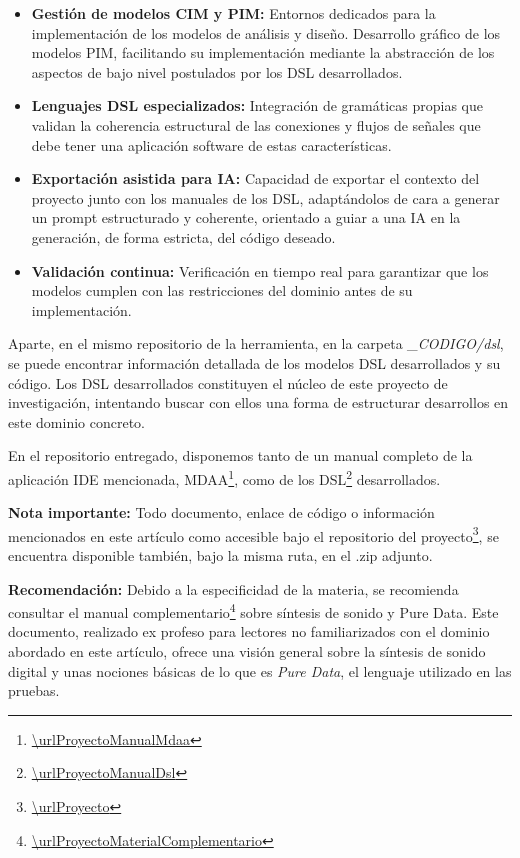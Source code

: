 \begin{itemize}
    \item \textbf{Gestión de modelos CIM y PIM:} Entornos dedicados para la implementación de los modelos de análisis y diseño. Desarrollo gráfico de los modelos PIM, facilitando su implementación mediante la abstracción de los aspectos de bajo nivel postulados por los DSL desarrollados.
    \item \textbf{Lenguajes DSL especializados:} Integración de gramáticas propias que validan la coherencia estructural de las conexiones y flujos de señales que debe tener una aplicación software de estas características.
    \item \textbf{Exportación asistida para IA:} Capacidad de exportar el contexto del proyecto junto con los manuales de los DSL, adaptándolos de cara a generar un prompt estructurado y coherente, orientado a guiar a una IA en la generación, de forma estricta, del código deseado.
    \item \textbf{Validación continua:} Verificación en tiempo real para garantizar que los modelos cumplen con las restricciones del dominio antes de su implementación.
\end{itemize}

Aparte, en el mismo repositorio de la herramienta, en la carpeta \textit{\_CODIGO/dsl}, se puede encontrar información detallada de los modelos DSL desarrollados y su código. Los DSL desarrollados constituyen el núcleo de este proyecto de investigación, intentando buscar con ellos una forma de estructurar desarrollos en este dominio concreto.

En el repositorio entregado, disponemos tanto de un manual completo de la aplicación IDE mencionada, MDAA\footnote{\url{\urlProyectoManualMdaa}}, como de los DSL\footnote{\url{\urlProyectoManualDsl}} desarrollados.

\textbf{Nota importante:} Todo documento, enlace de código o información mencionados en este artículo como accesible bajo el repositorio del proyecto\footnote{\url{\urlProyecto}}, se encuentra disponible también, bajo la misma ruta, en el .zip adjunto.

\textbf{Recomendación:} Debido a la especificidad de la materia, se recomienda consultar el manual complementario\footnote{\url{\urlProyectoMaterialComplementario}} sobre síntesis de sonido y Pure Data. Este documento, realizado ex profeso para lectores no familiarizados con el dominio abordado en este artículo, ofrece una visión general sobre la síntesis de sonido digital y unas nociones básicas de lo que es \textit{Pure Data}, el lenguaje utilizado en las pruebas.

